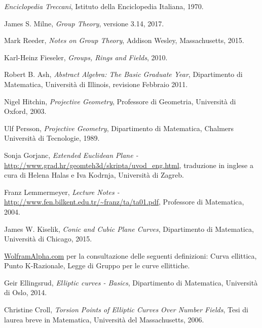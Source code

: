 \documentclass[a4paper,12pt]{tesiinfo}
\begin{document}
\begin{thebibliography}{99}

  \emph{Enciclopedia Treccani},
  Istituto della Enciclopedia Italiana,
  1970.


  James S. Milne,
  \emph{Group Theory}, 
  versione 3.14, 
  2017.
  
  Mark Reeder,
  \emph{Notes on Group Theory},
  Addison Wesley, Massachusetts,
  2015.
  
  Karl-Heinz Fieseler,
  \emph{Groups, Rings and Fields},
  2010.
  
  Robert B. Ash,
  \emph{Abstract Algebra: The Basic Graduate Year},
  Dipartimento di Matematica,
  Universit\`a di Illinois,
  revisione Febbraio 2011.
  
  Nigel Hitchin,
  \emph{Projective Geometry},
  Professore di Geometria,
  Universit\`a di Oxford,
  2003.
  
  Ulf Persson,
  \emph{Projective Geometry},
  Dipartimento di Matematica,
  Chalmers Universit\`a di Tecnologie,
  1989.
  
  Sonja Gorjanc,
  \emph{Extended Euclidean Plane - } 
  \url{http://www.grad.hr/geomteh3d/skripta/uvod_eng.html},
  traduzione in inglese a cura di Helena Halas e Iva Kodrnja,
  Universit\`a di Zagreb.
  
  Franz Lemmermeyer,
  \emph{Lecture Notes -}
  \url{http://www.fen.bilkent.edu.tr/~franz/ta/ta01.pdf},
  Professore di Matematica,
  2004.
  
  James W. Kiselik,
  \emph{Conic and Cubic Plane Curves},
  Dipartimento di Matematica,
  Universit\`a di Chicago,
  2015.

  \url{WolframAlpha.com} per la consultazione delle seguenti definizioni: Curva ellittica, Punto K-Razionale, Legge di Gruppo per le curve ellittiche.
  
  Geir Ellingsrud,
  \emph{Elliptic curves - Basics},
  Dipartimento di Matematica,
  Universit\`a di Oslo,
  2014.
  
  Christine Croll,
  \emph{Torsion Points of Elliptic Curves Over Number Fields},
  Tesi di laurea breve in Matematica,
  Universit\`a del Massachusetts,
  2006.
  

\end{thebibliography}
\end{document}
